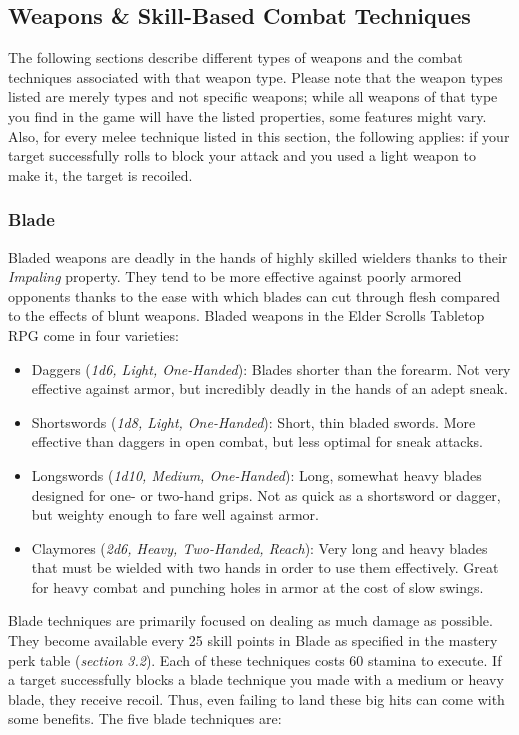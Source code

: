 \documentclass[12pt]{book}
\begin{document}
\subsection{Weapons \& Skill-Based Combat Techniques}

The following sections describe different types of weapons and the combat techniques associated with that weapon type. Please note that the weapon types listed are merely types and not specific weapons; while all weapons of that type you find in the game will have the listed properties, some features might vary. Also, for every melee technique listed in this section, the following applies: if your target successfully rolls to block your attack and you used a light weapon to make it, the target is recoiled.

\subsubsection{Blade}

Bladed weapons are deadly in the hands of highly skilled wielders thanks to their \textit{Impaling} property. They tend to be more effective against poorly armored opponents thanks to the ease with which blades can cut through flesh compared to the effects of blunt weapons. Bladed weapons in the Elder Scrolls Tabletop RPG come in four varieties:

\begin{itemize}
	\item Daggers (\textit{1d6, Light, One-Handed}): Blades shorter than the forearm. Not very effective against armor, but incredibly deadly in the hands of an adept sneak.
	\item Shortswords (\textit{1d8, Light, One-Handed}): Short, thin bladed swords. More effective than daggers in open combat, but less optimal for sneak attacks.
	\item Longswords (\textit{1d10, Medium, One-Handed}): Long, somewhat heavy blades designed for one- or two-hand grips. Not as quick as a shortsword or dagger, but weighty enough to fare well against armor.
	\item Claymores (\textit{2d6, Heavy, Two-Handed, Reach}): Very long and heavy blades that must be wielded with two hands in order to use them effectively. Great for heavy combat and punching holes in armor at the cost of slow swings.
\end{itemize}

Blade techniques are primarily focused on dealing as much damage as possible. They become available every 25 skill points in Blade as specified in the mastery perk table (\textit{section 3.2}). Each of these techniques costs 60 stamina to execute. If a target successfully blocks a blade technique you made with a medium or heavy blade, they receive recoil. Thus, even failing to land these big hits can come with some benefits. The five blade techniques are:
\end{document}
